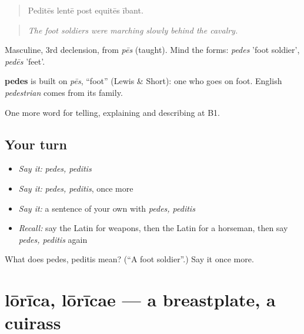 \begin{quote}
Peditēs lentē post equitēs ībant.
\end{quote}

\begin{quote}
\emph{The foot soldiers were marching slowly behind the cavalry.}
\end{quote}

Masculine, 3rd declension, from \emph{pēs} (taught). Mind the forms: \emph{pedes} 'foot soldier', \emph{pedēs} 'feet'.

\begin{cousinweb}
\textbf{pedes} is built on \emph{pēs}, \textquotedblleft{}foot\textquotedblright{} (Lewis \& Short): one who goes on foot. English \emph{pedestrian} comes from its family.
\end{cousinweb}

\begin{grammarlens}[title={What you've built}]
One more word for telling, explaining and describing at B1.
\end{grammarlens}

\subsection*{Your turn}
\begin{itemize}
\raggedright
  \item \emph{Say it:} \emph{pedes, peditis}
  \item \emph{Say it:} \emph{pedes, peditis}, once more
  \item \emph{Say it:} a sentence of your own with \emph{pedes, peditis}
  \item \emph{Recall:} say the Latin for weapons, then the Latin for a horseman, then say \emph{pedes, peditis} again
\end{itemize}

\begin{tcolorbox}[breakable,colback=teal!4,colframe=teal!35!black,title={Before you move on}]
What does pedes, peditis mean? (\textquotedblleft{}A foot soldier\textquotedblright{}.) Say it once more.
\end{tcolorbox}
\section[lōrīca, lōrīcae]{lōrīca, lōrīcae — a breastplate, a cuirass}

\label{lesson:LA-C340-lorica}



